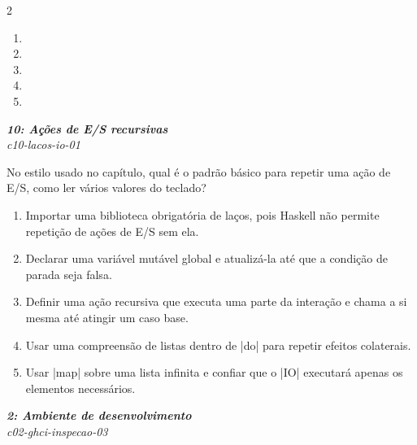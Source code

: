 \documentclass[a4paper,10pt,brazil]{article}
\begin{document}
\begin{multicols}{2}
\begin{enumerate}
  \item {}

  \item {}

  \item {}

  \item {}

  \item {}


\end{enumerate}

\begin{flushright}
  \footnotesize
  \textit{\textbf{10: Ações de E/S recursivas}}\\
  \textit{c10-lacos-io-01}\\

\end{flushright}
No estilo usado no capítulo, qual é o padrão básico para repetir uma ação de E/S, como ler vários valores do teclado?

\begin{enumerate}
  \item Importar uma biblioteca obrigatória de laços, pois Haskell não permite repetição de ações de E/S sem ela.

  \item Declarar uma variável mutável global e atualizá-la até que a condição de parada seja falsa.

  \item Definir uma ação recursiva que executa uma parte da interação e chama a si mesma até atingir um caso base.

  \item Usar uma compreensão de listas dentro de \haskellinline|do| para repetir efeitos colaterais.

  \item Usar \haskellinline|map| sobre uma lista infinita e confiar que o \haskellinline|IO| executará apenas os elementos necessários.


\end{enumerate}

\begin{flushright}
  \footnotesize
  \textit{\textbf{2: Ambiente de desenvolvimento}}\\
  \textit{c02-ghci-inspecao-03}\\


\end{flushright}
\end{multicols}
\end{document}
